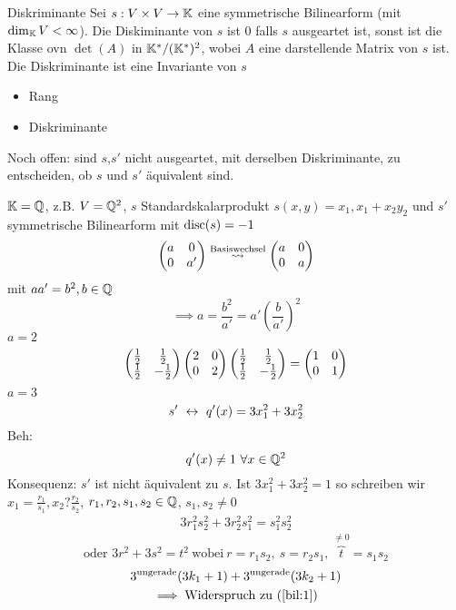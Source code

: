 \begin{Def}{Diskriminante}
  Sei $s:V\times V\to\mathbb{K}$ eine symmetrische Bilinearform (mit $\dim_{\mathbb{K}}V<\infty$). Die Diskiminante von $s$ ist 0 falls $s$ ausgeartet ist, sonst ist die Klasse ovn $\det(A)$ in $\mathbb{K}^*/( \mathbb{K}^*)^2$, wobei $A$ eine darstellende Matrix von $s$ ist. Die Diskriminante ist eine Invariante von $s$
  \begin{itemize}
    \item Rang
    \item Diskriminante
  \end{itemize}
\end{Def}
\begin{Bem}
  Noch offen: sind $s$,$s'$ nicht ausgeartet, mit derselben Diskriminante, zu entscheiden, ob $s$ und $s'$ äquivalent sind.
\end{Bem}
\begin{Bsp}
  $\mathbb{K}=\mathbb{Q}$, z.B. $V=\mathbb{Q}^2$, $s$ Standardskalarprodukt $s(x,y)=x_1,x_1+x_2y_2$ und $s'$ symmetrische Bilinearform mit $\operatorname{disc}(s)=-1$
  \[\begin{pmatrix}a&0\\0&a'\end{pmatrix}\stackrel{\text{Basiswechsel}}{\rightsquigarrow}\begin{pmatrix}a&0\\0&a\end{pmatrix}\]
  mit $aa'=b^2, b\in \mathbb{Q}$
  \[\implies a=\frac{b^2}{a'}=a'\left( \frac{b}{a'} \right)^2\]
  $a=2$
  \[\begin{pmatrix}\frac{1}{2}&\frac{1}{2}\\\frac{1}{2}&-\frac{1}{2}\end{pmatrix}\begin{pmatrix}2&0\\0&2\end{pmatrix}\begin{pmatrix}\frac{1}{2}&\frac{1}{2}\\\frac{1}{2}&-\frac{1}{2}\end{pmatrix}=\begin{pmatrix}1&0\\0&1\end{pmatrix}\]
  $a=3$
  \[s'\ \leftrightarrow\ q'(x)=3x^2_1+3x^2_2\]
  Beh: \[q'(x)\neq 1\ \forall x\in \mathbb{Q}^2\]
  Konsequenz: $s'$ ist nicht äquivalent zu $s$. Ist $3x^2_1+3x^2_2=1$ so schreiben wir $x_1=\frac{r_1}{s_1},x_2?\frac{r_2}{s_2}$, $r_1,r_2,s_1,s_2\in\mathbb{Q}$, $s_1,s_2\neq 0$
  \begin{gather*}
    3r_1^2s_2^2+3r_2^2s_1^2=s^2_1s^2_2
  \end{gather*}
  \begin{equation}
    \text{oder }3r^2+3s^2=t^2\ \text{wobei}\ r=r_1s_2,\ s=r_2s_1,\ \overbrace{t}^{\neq 0}=s_1s_2
    \label{bil:1}
  \end{equation}
    \begin{gather*}
    3^\text{ungerade}(3k_1+1)+3^\text{ungerade}(3k_2+1)\\
    \implies \text{Widerspruch zu } (\ref{bil:1})
  \end{gather*}
\end{Bsp}
